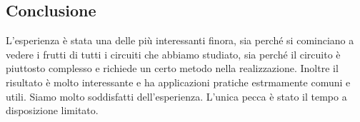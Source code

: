 \subsection{Conclusione}

L'esperienza è stata una delle più interessanti finora, sia perché si cominciano a vedere i frutti
di tutti i circuiti che abbiamo studiato, sia perché il circuito è piuttosto complesso e richiede
un certo metodo nella realizzazione. Inoltre il risultato è molto interessante e ha applicazioni pratiche
estrmamente comuni e utili. Siamo molto soddisfatti dell'esperienza. L'unica pecca è stato il tempo a disposizione
limitato.